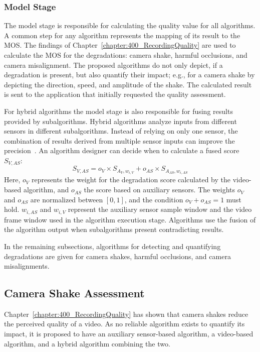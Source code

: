 \subsubsection{Model Stage}
\label{sec:554_model_stage}
The model stage is responsible for calculating the quality value  for all algorithms. 
A common step for any algorithm represents the mapping of its result to the \ac{MOS}.
The findings of Chapter~\ref{chapter:400_RecordingQuality} are used to calculate the \ac{MOS} for the degradations: camera shake, harmful occlusions, and camera misalignment.
The proposed algorithms do not only depict, if a degradation is present, but also quantify their impact; e.g., for a camera shake by depicting the direction, speed, and amplitude of the shake.
The calculated result is sent to the application that initially requested the quality assessment. 

For hybrid algorithms the model stage is also responsible for fusing results provided by subalgorithms. Hybrid algorithms analyze inputs from different sensors in different subalgorithms.
Instead of relying on only one sensor, the combination of results derived from multiple sensor inputs can improve the precision~\cite{Cricri2012}. 
An algorithm designer can decide when to calculate a fused score $S_{V,AS}$:
\begin{equation}
S_{V,AS} = o_{V} \times S_{A_{V},w_{i,V}} + o_{AS} \times S_{A_{AS},w_{i,AS}}
\end{equation}
Here, $o_{V}$ represents the weight for the degradation score calculated by the video-based algorithm, and $o_{AS}$ the score based on auxiliary sensors. 
The weights $o_{V}$ and $o_{AS}$ are normalized between $[0, 1]$, and the condition $o_{V} + o_{AS} = 1 $ must hold.
$w_{i,AS}$ and $w_{i,V}$ represent the auxiliary sensor sample window and the video frame window used in the algorithm execution stage.
Algorithms use the fusion of the algorithm output when subalgorithms present contradicting results.

In the remaining subsections, algorithms for detecting and quantifying degradations are given for camera shakes, harmful occlusions, and camera misalignments.   
\subsection{Camera Shake Assessment}
\label{sec:554_QA_Camera_Shakiness}
Chapter~\ref{chapter:400_RecordingQuality} has shown that camera shakes reduce the perceived quality of a video. As no reliable algorithm exists to quantify its impact, it is proposed to have an auxiliary sensor-based algorithm, a video-based algorithm, and a hybrid algorithm combining the two.
